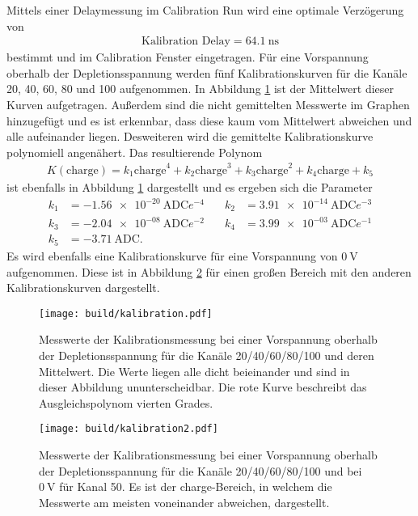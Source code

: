 Mittels einer Delaymessung im Calibration Run wird eine optimale Verzögerung von
\begin{align}
  \text{Kalibration Delay} = \SI{64.1}{\nano\second}
\end{align}
bestimmt und im Calibration Fenster eingetragen. Für eine Vorspannung oberhalb der
Depletionsspannung werden fünf Kalibrationskurven für die Kanäle 20, 40, 60, 80 und 100 aufgenommen. In Abbildung \ref{fig:kalibration}
ist der Mittelwert dieser Kurven aufgetragen. Außerdem sind die nicht gemittelten
Messwerte im Graphen hinzugefügt und es ist erkennbar, dass diese kaum vom Mittelwert abweichen und
alle aufeinander liegen. Desweiteren wird die gemittelte Kalibrationskurve polynomiell angenähert.
Das resultierende Polynom
\begin{align}
  K(\text{charge}) = k_1 \text{charge}^4 + k_2 \text{charge}^3 + k_3 \text{charge}^2 + k_4 \text{charge} + k_5
  \label{eqn:kalibrationspolynom}
\end{align}
ist ebenfalls in Abbildung \ref{fig:kalibration} dargestellt und es ergeben sich die Parameter
\begin{align*}
  k_1 &= \SI{-1.56e-20}{\text{ADC}e^{-4}} &\quad k_2 &= \SI{3.91e-14}{\text{ADC}e^{-3}} \\
  k_3 &= \SI{-2.04e-08}{\text{ADC}e^{-2}} &\quad k_4 &= \SI{3.99e-03}{\text{ADC}e^{-1}} \\
  k_5 &= \SI{-3.71}{\text{ADC}}. &\quad \phantom{f}&\phantom{=10}
\end{align*}
Es wird ebenfalls eine Kalibrationskurve für eine Vorspannung von $\SI{0}{\volt}$ aufgenommen. Diese ist in Abbildung
\ref{fig:kalibration2} für einen großen Bereich mit den anderen Kalibrationskurven dargestellt.

\begin{figure}
  \centering
  \texttt{[image: build/kalibration.pdf]}
  \caption{Messwerte der Kalibrationsmessung bei einer Vorspannung oberhalb der Depletionsspannung für die Kanäle 20/40/60/80/100 und deren Mittelwert.
  Die Werte liegen alle dicht beieinander und sind in dieser Abbildung ununterscheidbar. Die rote Kurve beschreibt das Ausgleichspolynom vierten Grades.}
  \label{fig:kalibration}
\end{figure}

\begin{figure}
  \centering
  \texttt{[image: build/kalibration2.pdf]}
  \caption{Messwerte der Kalibrationsmessung bei einer Vorspannung oberhalb der Depletionsspannung für die Kanäle 20/40/60/80/100 und bei $\SI{0}{\volt}$ für Kanal 50.
  Es ist der charge-Bereich, in welchem die Messwerte am meisten voneinander abweichen, dargestellt.}
  \label{fig:kalibration2}
\end{figure}


